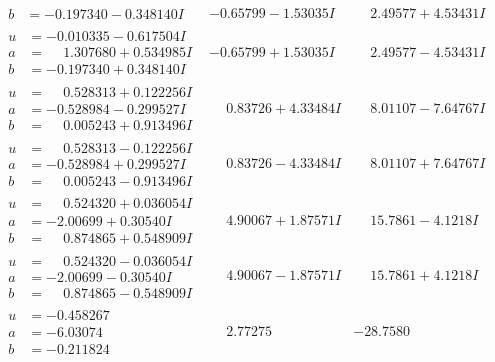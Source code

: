 \documentclass[1p]{elsarticle_modified}
\theoremstyle{definition}
\begin{document}
$$\begin{array}{c|c|c}
\begin{aligned}
b &= -0.197340 - 0.348140 I\end{aligned}
 & -0.65799 - 1.53035 I & \phantom{-}2.49577 + 4.53431 I \\ \hline\begin{aligned}
u &= -0.010335 - 0.617504 I \\
a &= \phantom{-}1.307680 + 0.534985 I \\
b &= -0.197340 + 0.348140 I\end{aligned}
 & -0.65799 + 1.53035 I & \phantom{-}2.49577 - 4.53431 I \\ \hline\begin{aligned}
u &= \phantom{-}0.528313 + 0.122256 I \\
a &= -0.528984 - 0.299527 I \\
b &= \phantom{-}0.005243 + 0.913496 I\end{aligned}
 & \phantom{-}0.83726 + 4.33484 I & \phantom{-}8.01107 - 7.64767 I \\ \hline\begin{aligned}
u &= \phantom{-}0.528313 - 0.122256 I \\
a &= -0.528984 + 0.299527 I \\
b &= \phantom{-}0.005243 - 0.913496 I\end{aligned}
 & \phantom{-}0.83726 - 4.33484 I & \phantom{-}8.01107 + 7.64767 I \\ \hline\begin{aligned}
u &= \phantom{-}0.524320 + 0.036054 I \\
a &= -2.00699 + 0.30540 I \\
b &= \phantom{-}0.874865 + 0.548909 I\end{aligned}
 & \phantom{-}4.90067 + 1.87571 I & \phantom{-}15.7861 - 4.1218 I \\ \hline\begin{aligned}
u &= \phantom{-}0.524320 - 0.036054 I \\
a &= -2.00699 - 0.30540 I \\
b &= \phantom{-}0.874865 - 0.548909 I\end{aligned}
 & \phantom{-}4.90067 - 1.87571 I & \phantom{-}15.7861 + 4.1218 I \\ \hline\begin{aligned}
u &= -0.458267\phantom{ +0.000000I} \\
a &= -6.03074\phantom{ +0.000000I} \\
b &= -0.211824\phantom{ +0.000000I}\end{aligned}
 & \phantom{-}2.77275\phantom{ +0.000000I} & -28.7580\phantom{ +0.000000I} \\ \hline\begin{aligned}

\end{aligned}
\end{array}$$
\end{document}
